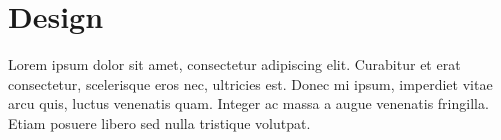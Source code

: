 \section{Design}
Lorem ipsum dolor sit amet, consectetur adipiscing elit. Curabitur et erat consectetur, 
scelerisque eros nec, ultricies est. Donec mi ipsum, imperdiet vitae arcu quis, luctus venenatis quam. 
Integer ac massa a augue venenatis fringilla. Etiam posuere libero sed nulla tristique volutpat.